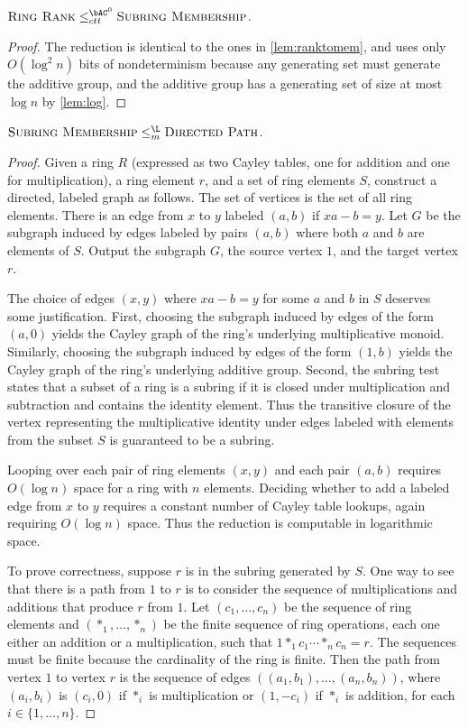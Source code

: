 \begin{lemma}\label{lem:ringranktomem}
  $\textsc{Ring Rank} \leq_{ctt}^{\bAC^0} \textsc{Subring Membership}$.
\end{lemma}
\begin{proof}
  The reduction is identical to the ones in \autoref{lem:ranktomem}, and uses only $O(\log^2 n)$ bits of nondeterminism because any generating set must generate the additive group, and the additive group has a generating set of size at most $\log n$ by \autoref{lem:log}.
\end{proof}

\begin{lemma}\label{lem:memtopath}
  $\textsc{Subring Membership} \leq_m^{\L} \textsc{Directed Path}$.
\end{lemma}
\begin{proof}
  Given a ring $R$ (expressed as two Cayley tables, one for addition and one for multiplication), a ring element $r$, and a set of ring elements $S$, construct a directed, labeled graph as follows.
  The set of vertices is the set of all ring elements.
  There is an edge from $x$ to $y$ labeled $(a, b)$ if $x a - b = y$.
  Let $G$ be the subgraph induced by edges labeled by pairs $(a, b)$ where both $a$ and $b$ are elements of $S$.
  Output the subgraph $G$, the source vertex $1$, and the target vertex $r$.

  The choice of edges $(x, y)$ where $x a - b = y$ for some $a$ and $b$ in $S$ deserves some justification.
  First, choosing the subgraph induced by edges of the form $(a, 0)$ yields the Cayley graph of the ring's underlying multiplicative monoid.
  Similarly, choosing the subgraph induced by edges of the form $(1, b)$ yields the Cayley graph of the ring's underlying additive group.
  Second, the subring test states that a subset of a ring is a subring if it is closed under multiplication and subtraction and contains the identity element.
  Thus the transitive closure of the vertex representing the multiplicative identity under edges labeled with elements from the subset $S$ is guaranteed to be a subring.

  Looping over each pair of ring elements $(x, y)$ and each pair $(a, b)$ requires $O(\log n)$ space for a ring with $n$ elements.
  Deciding whether to add a labeled edge from $x$ to $y$ requires a constant number of Cayley table lookups, again requiring $O(\log n)$ space.
  Thus the reduction is computable in logarithmic space.

  To prove correctness, suppose $r$ is in the subring generated by $S$.
  One way to see that there is a path from $1$ to $r$ is to consider the sequence of multiplications and additions that produce $r$ from $1$.
  Let $(c_1, \dotsc, c_n)$ be the sequence of ring elements and $(\ast_1, \dotsc, \ast_n)$ be the finite sequence of ring operations, each one either an addition or a multiplication, such that $1 \ast_1 c_1 \dotsb \ast_n c_n = r$.
  The sequences must be finite because the cardinality of the ring is finite.
  Then the path from vertex $1$ to vertex $r$ is the sequence of edges $((a_1, b_1), \dotsc, (a_n, b_n))$, where $(a_i, b_i)$ is $(c_i, 0)$ if $\ast_i$ is multiplication or $(1, -c_i)$ if $\ast_i$ is addition, for each $i \in \{1, \dotsc, n\}$.


\end{proof}
